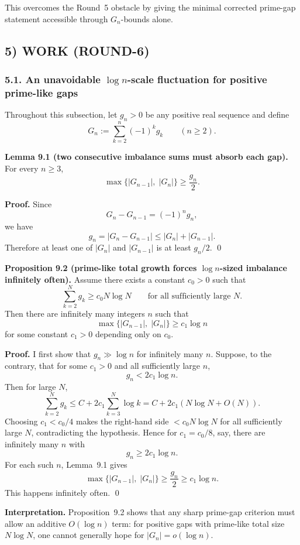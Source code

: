 This overcomes the Round~5 obstacle by giving the minimal corrected prime-gap statement accessible through \(G_n\)-bounds alone.

\subsection*{5) WORK (ROUND-6)}

\subsubsection*{5.1. An unavoidable \(\log n\)-scale fluctuation for positive prime-like gaps}

Throughout this subsection, let \(g_n>0\) be any positive real sequence and define
\[
G_n:=\sum_{k=2}^n (-1)^k g_k \qquad (n\ge 2).
\]

\textbf{Lemma 9.1 (two consecutive imbalance sums must absorb each gap).}
For every \(n\ge 3\),
\[
\max\{|G_{n-1}|,\;|G_n|\}\ge \frac{g_n}{2}.
\]

\textbf{Proof.}
Since
\[
G_n-G_{n-1}=(-1)^n g_n,
\]
we have
\[
g_n = |G_n-G_{n-1}|
\le |G_n|+|G_{n-1}|.
\]
Therefore at least one of \(|G_n|\) and \(|G_{n-1}|\) is at least \(g_n/2\). \qed

\medskip

\textbf{Proposition 9.2 (prime-like total growth forces \(\log n\)-sized imbalance infinitely often).}
Assume there exists a constant \(c_0>0\) such that
\[
\sum_{k=2}^N g_k \ge c_0 N\log N
\qquad\text{for all sufficiently large }N.
\]
Then there are infinitely many integers \(n\) such that
\[
\max\{|G_{n-1}|,\;|G_n|\}\ge c_1 \log n
\]
for some constant \(c_1>0\) depending only on \(c_0\).

\textbf{Proof.}
I first show that \(g_n\gg \log n\) for infinitely many \(n\).
Suppose, to the contrary, that for some \(c_1>0\) and all sufficiently large \(n\),
\[
g_n < 2c_1 \log n.
\]
Then for large \(N\),
\[
\sum_{k=2}^N g_k
\le C + 2c_1 \sum_{k=3}^N \log k
= C + 2c_1 (N\log N + O(N)).
\]
Choosing \(c_1<c_0/4\) makes the right-hand side \(< c_0 N\log N\) for all sufficiently large \(N\), contradicting the hypothesis.
Hence for \(c_1=c_0/8\), say, there are infinitely many \(n\) with
\[
g_n \ge 2c_1 \log n.
\]
For each such \(n\), Lemma~9.1 gives
\[
\max\{|G_{n-1}|,\;|G_n|\}\ge \frac{g_n}{2}\ge c_1 \log n.
\]
This happens infinitely often. \qed

\medskip

\textbf{Interpretation.}
Proposition~9.2 shows that any sharp prime-gap criterion must allow an additive \(O(\log n)\) term:
for positive gaps with prime-like total size \(N\log N\), one cannot generally hope for \(|G_n|=o(\log n)\).

